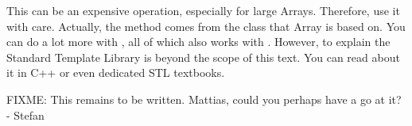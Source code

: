 This can be an expensive operation, especially for large Arrays.
Therefore, use it with care. Actually, the  method
comes from the  class that Array is based on. You
can do a lot more with , all of which also works
with . However, to explain the Standard Template Library
is beyond the scope of this text. You can read about it in C++ or even
dedicated STL textbooks.

\label{sec:matpack:sparse}

FIXME: This remains to be written. Mattias, could you perhaps have a
go at it? - Stefan


